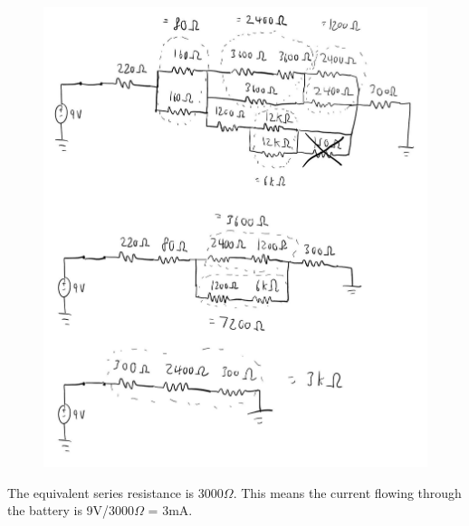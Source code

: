 \documentclass{article}
\begin{document}
\begin{figure}[H]
    \centering
    \includegraphics[width=1\textwidth]{image.jpg}
\end{figure}
The equivalent series resistance is 3000$\Omega$. This means the current flowing through
the battery is 9V/3000$\Omega$ = 3mA.
\end{document}

